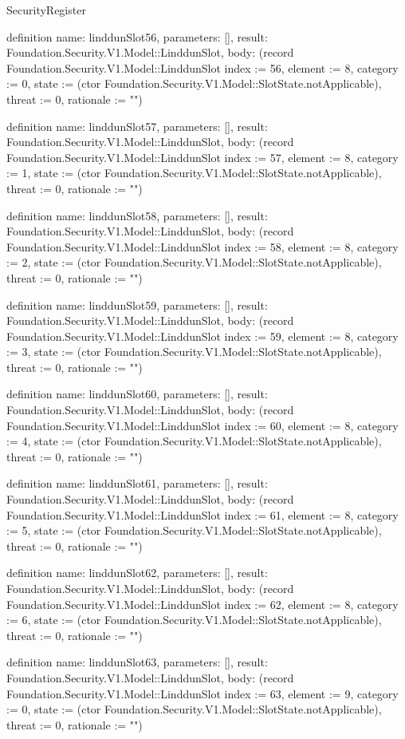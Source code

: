 \begin{lexlean}{SecurityRegister}
\begin{semanticmodule}
definition{
  name: linddunSlot56,
  parameters: [],
  result: Foundation.Security.V1.Model::LinddunSlot,
  body: (record Foundation.Security.V1.Model::LinddunSlot {index := 56, element := 8, category := 0, state := (ctor Foundation.Security.V1.Model::SlotState.notApplicable), threat := 0, rationale := ""})
}

definition{
  name: linddunSlot57,
  parameters: [],
  result: Foundation.Security.V1.Model::LinddunSlot,
  body: (record Foundation.Security.V1.Model::LinddunSlot {index := 57, element := 8, category := 1, state := (ctor Foundation.Security.V1.Model::SlotState.notApplicable), threat := 0, rationale := ""})
}

definition{
  name: linddunSlot58,
  parameters: [],
  result: Foundation.Security.V1.Model::LinddunSlot,
  body: (record Foundation.Security.V1.Model::LinddunSlot {index := 58, element := 8, category := 2, state := (ctor Foundation.Security.V1.Model::SlotState.notApplicable), threat := 0, rationale := ""})
}

definition{
  name: linddunSlot59,
  parameters: [],
  result: Foundation.Security.V1.Model::LinddunSlot,
  body: (record Foundation.Security.V1.Model::LinddunSlot {index := 59, element := 8, category := 3, state := (ctor Foundation.Security.V1.Model::SlotState.notApplicable), threat := 0, rationale := ""})
}

definition{
  name: linddunSlot60,
  parameters: [],
  result: Foundation.Security.V1.Model::LinddunSlot,
  body: (record Foundation.Security.V1.Model::LinddunSlot {index := 60, element := 8, category := 4, state := (ctor Foundation.Security.V1.Model::SlotState.notApplicable), threat := 0, rationale := ""})
}

definition{
  name: linddunSlot61,
  parameters: [],
  result: Foundation.Security.V1.Model::LinddunSlot,
  body: (record Foundation.Security.V1.Model::LinddunSlot {index := 61, element := 8, category := 5, state := (ctor Foundation.Security.V1.Model::SlotState.notApplicable), threat := 0, rationale := ""})
}

definition{
  name: linddunSlot62,
  parameters: [],
  result: Foundation.Security.V1.Model::LinddunSlot,
  body: (record Foundation.Security.V1.Model::LinddunSlot {index := 62, element := 8, category := 6, state := (ctor Foundation.Security.V1.Model::SlotState.notApplicable), threat := 0, rationale := ""})
}

definition{
  name: linddunSlot63,
  parameters: [],
  result: Foundation.Security.V1.Model::LinddunSlot,
  body: (record Foundation.Security.V1.Model::LinddunSlot {index := 63, element := 9, category := 0, state := (ctor Foundation.Security.V1.Model::SlotState.notApplicable), threat := 0, rationale := ""})
}


\end{semanticmodule}
\end{lexlean}
